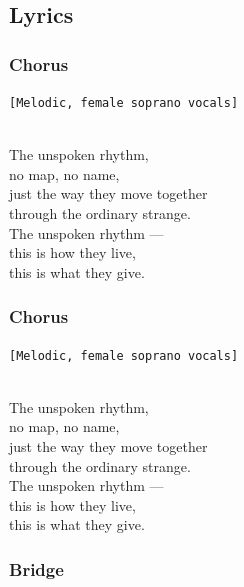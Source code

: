 \documentclass[]{article}
\begin{document}
\subsection{Lyrics}\label{lyrics-41}

\subsubsection{Chorus}\label{chorus-73}

\texttt{{[}Melodic,\ female\ soprano\ vocals{]}}\strut \\
The unspoken rhythm,\\
no map, no name,\\
just the way they move together\\
through the ordinary strange.\\
The unspoken rhythm ---\\
this is how they live,\\
this is what they give.

\subsubsection{Chorus}\label{chorus-74}

\texttt{{[}Melodic,\ female\ soprano\ vocals{]}}\strut \\
The unspoken rhythm,\\
no map, no name,\\
just the way they move together\\
through the ordinary strange.\\
The unspoken rhythm ---\\
this is how they live,\\
this is what they give.

\subsubsection{Bridge}\label{bridge-19}
\end{document}
